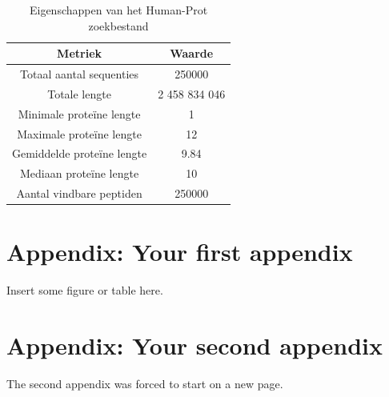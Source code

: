 \documentclass[11pt,dutch,faculty=we,layout=titlefont,underline=false,titleUppercase=true,titleUnderline=true]{ugent2016-report}
\begin{document}
    \begin{table}[h!]
        \centering
        \begin{tabular}{ c c }
            Metriek                    & Waarde        \\
            \hline\hline
            Totaal aantal sequenties   & 250000        \\
            Totale lengte              & 2 458 834 046 \\
            Minimale proteïne lengte   & 1             \\
            Maximale proteïne lengte & 12
            \\
            Gemiddelde proteïne lengte & 9.84          \\
            Mediaan proteïne lengte    & 10            \\
            Aantal vindbare peptiden   & 250000        \\
            \hline
        \end{tabular}
        \caption{Eigenschappen van het Human-Prot zoekbestand}
        \label{tab:humanprot_zoekbestand}
    \end{table}



    \printbibliography[heading=bibintoc,title={Referenties}] %


    \appendix


    \section{Appendix: Your first appendix}
    Insert some figure or table here.

    \newpage


    \section{Appendix: Your second appendix}
    The second appendix was forced to start on a new page.
\end{document}
